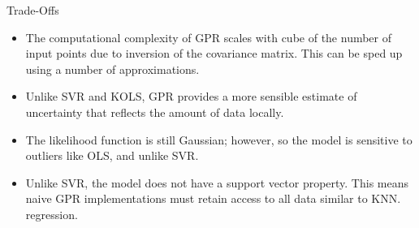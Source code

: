 \documentclass[serif,xcolor=pdftex,dvipsnames,table,hyperref={bookmarks=false,breaklinks}]{beamer}
\begin{document}
\begin{frame}[t]{Trade-Offs}

\begin{itemize}
\item The computational complexity of GPR scales with cube of the number of
input points due to inversion of the covariance matrix. This can be sped up 
using a number of approximations.

\item Unlike SVR and KOLS, GPR provides a more sensible estimate of uncertainty
that reflects the amount of data locally.

\item The likelihood function is still Gaussian; however, so the model is 
sensitive to outliers like OLS, and unlike SVR.

\item Unlike SVR, the model does not have a support vector property. This means
naive GPR implementations must retain access to all data similar to KNN. 
regression.

\end{itemize}

\end{frame}
\end{document}
